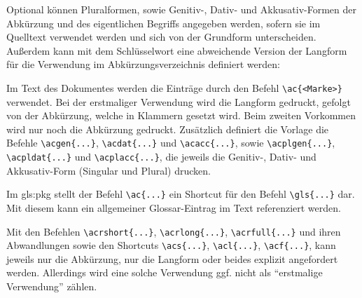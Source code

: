 Optional können Pluralformen, sowie Genitiv-, Dativ- und Akkusativ-Formen 
der Abkürzung und des eigentlichen Begriffs angegeben werden,
sofern sie im Quelltext verwendet werden und sich von der Grundform unterscheiden.
Außerdem kann mit dem Schlüsselwort 
eine abweichende Version der Langform für die Verwendung im Abkürzungsverzeichnis definiert werden:

\begin{latex}[caption={Definition einer Abkürzung mit Zusatzangaben},label={lst:AdvancedAcronymEntry}]
\end{latex}

Im Text des Dokumentes werden die Einträge durch den Befehl \lstinline|\ac{<Marke>}| verwendet.
Bei der erstmaliger Verwendung wird die Langform gedruckt, gefolgt von der Abkürzung, welche in Klammern gesetzt wird.
Beim zweiten Vorkommen wird nur noch die Abkürzung gedruckt.
Zusätzlich definiert die Vorlage die Befehle
\lstinline|\acgen{...}|, \lstinline|\acdat{...}| und \lstinline|\acacc{...}|, sowie
\lstinline|\acplgen{...}|, \lstinline|\acpldat{...}| und \lstinline|\acplacc{...}|,
die jeweils die Genitiv-, Dativ- und Akkusativ-Form (Singular und Plural) drucken.

Im \gls{gls:pkg}  stellt der Befehl \lstinline|\ac{...}| ein Shortcut für den Befehl \lstinline|\gls{...}| dar.
Mit diesem kann ein allgemeiner Glossar-Eintrag im Text referenziert werden.

Mit den Befehlen
\lstinline|\acrshort{...}|, \lstinline|\acrlong{...}|, \lstinline|\acrfull{...}|
und ihren Abwandlungen sowie den Shortcuts
\lstinline|\acs{...}|, \lstinline|\acl{...}|, \lstinline|\acf{...}|,
kann jeweils nur die Abkürzung, nur die Langform oder beides explizit angefordert werden.
Allerdings wird eine solche Verwendung ggf. nicht als \enquote{erstmalige Verwendung} zählen.


